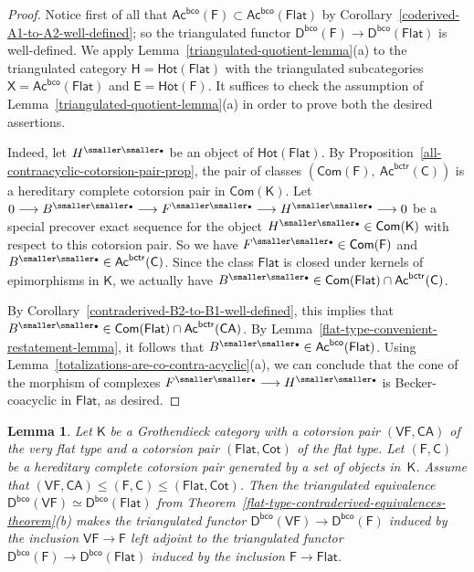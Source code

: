 \documentclass[12pt,a4paper]{amsart}
\newcommand{\+}{\nobreakdash-}
\renewcommand{\:}{\colon}
\newcommand{\rarrow}{\longrightarrow}
\newcommand{\bu}{{\text{\smaller\smaller$\scriptstyle\bullet$}}}
\newcommand{\sC}{\mathsf C}
\newcommand{\sD}{\mathsf D}
\newcommand{\sE}{\mathsf E}
\newcommand{\sF}{\mathsf F}
\newcommand{\sH}{\mathsf H}
\newcommand{\sK}{\mathsf K}
\newcommand{\sX}{\mathsf X}
\newcommand{\VF}{\mathsf{VF}}
\newcommand{\CA}{\mathsf{CA}}
\newcommand{\Flat}{\mathsf{Flat}}
\newcommand{\Cot}{\mathsf{Cot}}
\newcommand{\Hot}{\mathsf{Hot}}
\newcommand{\Com}{\mathsf{Com}}
\newcommand{\Ac}{\mathsf{Ac}}
\newcommand{\bco}{\mathsf{bco}}
\newcommand{\bctr}{\mathsf{bctr}}
\theoremstyle{plain}
\newtheorem{lem}[thm]{Lemma}
\theoremstyle{definition}
\begin{document}
\begin{proof}
 Notice first of all that $\Ac^\bco(\sF)\subset\Ac^\bco(\Flat)$ by
Corollary~\ref{coderived-A1-to-A2-well-defined}; so the triangulated
functor $\sD^\bco(\sF)\rarrow\sD^\bco(\Flat)$ is well-defined.
 We apply Lemma~\ref{triangulated-quotient-lemma}(a) to the triangulated
category $\sH=\Hot(\Flat)$ with the triangulated subcategories
$\sX=\Ac^\bco(\Flat)$ and $\sE=\Hot(\sF)$.
 It suffices to check the assumption of
Lemma~\ref{triangulated-quotient-lemma}(a) in order to prove both
the desired assertions.

 Indeed, let $H^\bu$ be an object of $\Hot(\Flat)$.
 By Proposition~\ref{all-contraacyclic-cotorsion-pair-prop}, the pair
of classes $(\Com(\sF),\>\Ac^\bctr(\sC))$ is a hereditary complete
cotorsion pair in $\Com(\sK)$.
 Let $0\rarrow B^\bu\rarrow F^\bu\rarrow H^\bu\rarrow0$ be a special
precover exact sequence for the object $H^\bu\in\Com(\sK)$ with
respect to this cotorsion pair.
 So we have $F^\bu\in\Com(\sF)$ and $B^\bu\in\Ac^\bctr(\sC)$.
 Since the class $\Flat$ is closed under kernels of epimorphisms in
$\sK$, we actually have $B^\bu\in\Com(\Flat)\cap\Ac^\bctr(\sC)$.

 By Corollary~\ref{contraderived-B2-to-B1-well-defined}, this implies
that $B^\bu\in\Com(\Flat)\cap\Ac^\bctr(\CA)$.
 By Lemma~\ref{flat-type-convenient-restatement-lemma}, it follows
that $B^\bu\in\Ac^\bco(\Flat)$.
 Using Lemma~\ref{totalizations-are-co-contra-acyclic}(a), we can
conclude that the cone of the morphism of complexes $F^\bu\rarrow
H^\bu$ is Becker-coacyclic in $\Flat$, as desired.
\end{proof}

\begin{lem} \label{coderived-VF-F-Flat-adjunction}
 Let\/ $\sK$ be a Grothendieck category with a cotorsion pair
$(\VF,\CA)$ of the very flat type and a cotorsion pair $(\Flat,\Cot)$
of the flat type.
 Let $(\sF,\sC)$ be a hereditary complete cotorsion pair generated by
a set of objects in\/~$\sK$.
 Assume that $(\VF,\CA)\le(\sF,\sC)\le(\Flat,\Cot)$.
 Then the triangulated equivalence\/
$\sD^\bco(\VF)\simeq\sD^\bco(\Flat)$ from
Theorem~\ref{flat-type-contraderived-equivalences-theorem}(b) makes
the triangulated functor\/ $\sD^\bco(\VF)\rarrow\sD^\bco(\sF)$
induced by the inclusion\/ $\VF\rarrow\sF$ left adjoint to
the triangulated functor\/ $\sD^\bco(\sF)\rarrow\sD^\bco(\Flat)$
induced by the inclusion\/ $\sF\rarrow\Flat$.
\end{lem}
\end{document}
